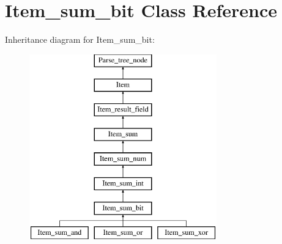 \hypertarget{classItem__sum__bit}{}\section{Item\+\_\+sum\+\_\+bit Class Reference}
\label{classItem__sum__bit}
Inheritance diagram for Item\+\_\+sum\+\_\+bit\+:\begin{figure}[H]
\begin{center}
\leavevmode
\includegraphics[height=8.000000cm]{classItem__sum__bit}
\end{center}
\end{figure}

